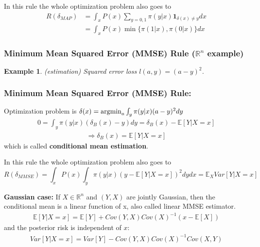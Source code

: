 \documentclass[11pt,a4paper]{article}
\newcommand{\argmin}{\operatornamewithlimits{argmin}}
\newtheorem{example}{Example}
\begin{document}
In this rule the whole optimization problem also goes to
\begin{equation}
    \begin{aligned}
        R(\delta_{MAP})&=\int_x P(x)\sum_{y=0,1} \pi(y|x) \mathbf{1}_{\delta(x)\neq y} dx\\
        &=\int_x P(x)\min\{\pi(1|x),\pi(0|x)\}dx
    \end{aligned}
    \nonumber
\end{equation}

\subsubsection{Minimum Mean Squared Error (MMSE) Rule ($\mathbb{R}^n$ example)}
\begin{example}
    (estimation) Squared error loss $l(a,y)=(a-y)^2$.
\end{example}
\subsubsection*{Minimum Mean Squared Error (MMSE) Rule:}
Optimization problem is $\delta(x)=\argmin_{a} \int_{y} \pi(y|x) (a-y)^2 dy$
\begin{equation}
    \begin{aligned}
        0=\int_{y} \pi(y|x) (\delta_B(x)-y) dy=\delta_B(x)-\mathbb{E}\left[Y|X=x\right]
    \end{aligned}
    \nonumber
\end{equation}
\begin{equation}
    \begin{aligned}
        \Rightarrow \delta_B(x)=\mathbb{E}\left[Y|X=x\right]
    \end{aligned}
    \nonumber
\end{equation}
which is called \textbf{conditional mean estimation}.

In this rule the whole optimization problem also goes to
$$R(\delta_{MMSE})=\int_x P(x)\int_y \pi(y|x) (y-\mathbb{E}\left[Y|X=x\right])^2 dy dx=\mathbb{E}_X Var\left[Y|X=x\right]$$

\textbf{Gaussian case:}
If $X\in \mathbb{R}^n$ and $(Y,X)$ are jointly Gaussian, then the conditional mean is a linear function of x, also called linear MMSE estimator.
\begin{equation}
    \begin{aligned}
        \mathbb{E}\left[Y|X=x\right]=\mathbb{E}[Y]+Cov(Y,X)Cov(X)^{-1}(x-\mathbb{E}[X])
    \end{aligned}
    \nonumber
\end{equation}
and the posterior risk is independent of $x$:
\begin{equation}
    \begin{aligned}
        Var\left[Y|X=x\right]=Var[Y]-Cov(Y,X)Cov(X)^{-1}Cov(X,Y)
    \end{aligned}
    \nonumber
\end{equation}
\end{document}
